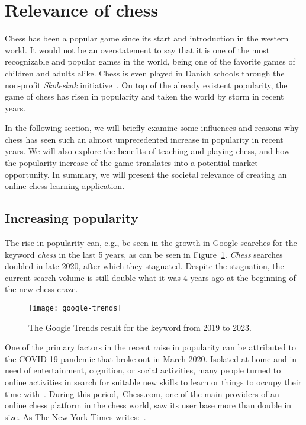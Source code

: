 \section{Relevance of chess}\label{sec:relevance-of-chess}

Chess has been a popular game since its start and introduction in the western world.
It would not be an overstatement to say that it is one of the most recognizable and popular games in the world, being
one of the favorite games of children and adults alike.
Chess is even played in Danish schools through the non-profit \textit{Skoleskak} initiative~\cite{skoleskak2024}.
On top of the already existent popularity, the game of chess has risen in popularity and taken
the world by storm in recent years.

In the following section, we will briefly examine some influences and reasons why chess has seen such an almost
unprecedented increase in popularity in recent years.
We will also explore the benefits of teaching and playing chess, and how the popularity increase of the game translates
into a potential market opportunity.
In summary, we will present the societal relevance of creating an online chess learning application.

\subsection{Increasing popularity}\label{subsec:increasing-popularity}

The rise in popularity can, e.g., be seen in the growth in Google searches for the keyword \textit{chess} in the last 5
years, as can be seen in Figure~\ref{fig:google-trends}.
\textit{Chess} searches doubled in late 2020, after which they stagnated.
Despite the stagnation, the current search volume is still double what it was 4 years ago at the beginning of the new
chess craze.

\begin{figure}
    \centering
    \texttt{[image: google-trends]}
    \caption{The Google Trends result for the keyword 
    from 2019 to 2023.}\label{fig:google-trends}
\end{figure}

One of the primary factors in the recent raise in popularity can be attributed to the COVID-19 pandemic that broke out
in March 2020.
Isolated at home and in need of entertainment, cognition, or social activities, many people turned to online activities
in search for suitable new skills to learn or things to occupy their time with~\cite{nyt2022}.
During this period,~\url{Chess.com}, one of the main providers of an online chess platform in the chess world,
saw its user base more than double in size.
As The New York Times writes:~.

